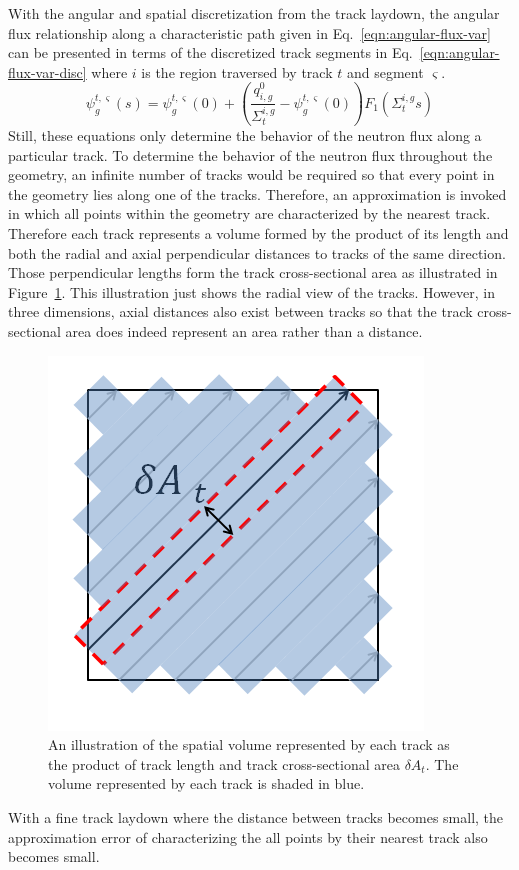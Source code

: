 With the angular and spatial discretization from the track laydown, the angular flux relationship along a characteristic path given in Eq.~\ref{eqn:angular-flux-var} can be presented in terms of the discretized track segments in Eq.~\ref{eqn:angular-flux-var-disc} where $i$ is the region traversed by track $t$ and segment $\varsigma$. 
\begin{dmath}
	\psi_g^{t,\varsigma}(s) = \psi^{t,\varsigma}_g(0) + \left( \frac{q^0_{i,g}}{\Sigma_{t}^{i,g}} - \psi_g^{t,\varsigma}(0) \right) F_1\left(\Sigma_{t}^{i,g} s \right)
	\label{eqn:angular-flux-var-disc}
\end{dmath}
Still, these equations only determine the behavior of the neutron flux along a particular track. To determine the behavior of the neutron flux throughout the geometry, an infinite number of tracks would be required so that every point in the geometry lies along one of the tracks. Therefore, an approximation is invoked in which all points within the geometry are characterized by the nearest track. Therefore each track represents a volume formed by the product of its length and both the radial and axial perpendicular distances to tracks of the same direction. Those perpendicular lengths form the track cross-sectional area as illustrated in Figure~\ref{fig:track-cross-section}. This illustration just shows the radial view of the tracks. However, in three dimensions, axial distances also exist between tracks so that the track cross-sectional area does indeed represent an area rather than a distance.
\begin{figure}[h!]
	\centering
	\includegraphics[width=0.6\linewidth]{figures/track-cross-sectional-area.PNG}
	\caption[]{An illustration of the spatial volume represented by each track as the product of track length and track cross-sectional area $\delta A_t$. The volume represented by each track is shaded in blue.}
	\label{fig:track-cross-section}
\end{figure}
With a fine track laydown where the distance between tracks becomes small, the approximation error of characterizing the all points by their nearest track also becomes small. 

